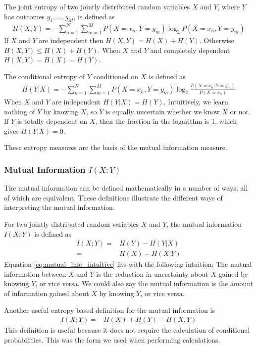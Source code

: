 \documentclass[a4paper,12pt]{article}
\theoremstyle{definition}
\begin{document}
The joint entropy of two jointly distributed random variables $X$ and $Y$, where $Y$ has outcomes $y_1, \dots, y_M$, is defined as
\begin{align}\label{joint_entropy}
H(X, Y) = -\sum_{n=1}^N \sum_{m=1}^M P(X=x_n, Y=y_m) \log _2 P(X=x_n, Y=y_m)
\end{align}
If $X$ and $Y$ are independent then $H(X,Y) = H(X) + H(Y)$. Otherwise $H(X,Y) \leq H(X) + H(Y)$. When $X$ and $Y$ and completely dependent $H(X,Y) = H(X) = H(Y)$.

The conditional entropy of $Y$ conditioned on $X$ is defined as
\begin{align}
H(Y|X) = -\sum_{n=1}^N \sum_{m=1}^M P(X=x_n, Y=y_m) \log _2 \frac{P(X=x_n, Y=y_m)}{P(X=x_n)}
\end{align}
When $X$ and $Y$ are independent $H(Y|X) = H(Y)$. Intuitively, we learn nothing of $Y$ by knowing $X$, so $Y$ is equally uncertain whether we know $X$ or not. If $Y$ is totally dependent on $X$, then the fraction in the logarithm is $1$, which gives $H(Y|X) = 0$.

These entropy measures are the basis of the mutual information measure.

\subsubsection{Mutual Information $I(X;Y)$}
The mutual information can be defined mathematically in a number of ways, all of which are equivalent. These definitions illustrate the different ways of interpreting the mutual information.

For two jointly distributed random variables $X$ and $Y$, the mutual information $I(X;Y)$ is defined as
\begin{align}\label{eq:mutual_info_intuitive}
I(X;Y)  =& H(Y) - H(Y|X) \\
        =& H(X) - H(X|Y)
\end{align}
Equation \ref{eq:mutual_info_intuitive} fits with the following intuition: The mutual information between $X$ and $Y$ is the reduction in uncertainty about $X$ gained by knowing $Y$, or vice versa. We could also say the mutual information is the amount of information gained about $X$ by knowing $Y$, or vice versa.

Another useful entropy based definition for the mutual information is
\begin{align}\label{eq:mutual_info_useful}
I(X;Y)  =& H(X) + H(Y) - H(X,Y)
\end{align}
This definition is useful because it does not require the calculation of conditional probabilities. This was the form we used when performing calculations.
\end{document}
